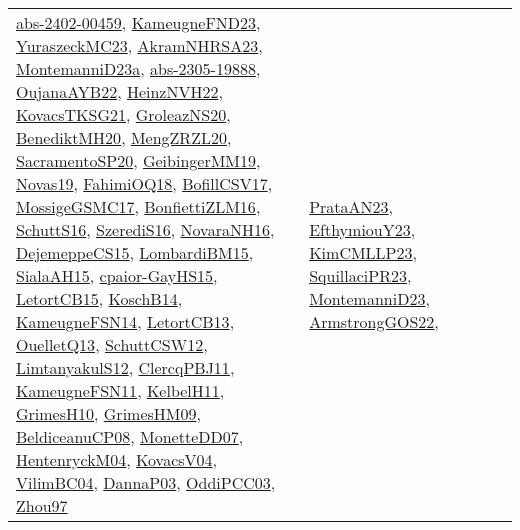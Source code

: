 {\begin{longtable}{llp{6cm}p{6cm}p{6cm}}
\href{articles/abs-2402-00459.pdf}{abs-2402-00459}\cite{abs-2402-00459}, \href{papers/KameugneFND23.pdf}{KameugneFND23}\cite{KameugneFND23}, \href{papers/YuraszeckMC23.pdf}{YuraszeckMC23}\cite{YuraszeckMC23}, \href{articles/AkramNHRSA23.pdf}{AkramNHRSA23}\cite{AkramNHRSA23}, \href{articles/MontemanniD23a.pdf}{MontemanniD23a}\cite{MontemanniD23a}, \href{articles/abs-2305-19888.pdf}{abs-2305-19888}\cite{abs-2305-19888}, \href{papers/OujanaAYB22.pdf}{OujanaAYB22}\cite{OujanaAYB22}, \href{articles/HeinzNVH22.pdf}{HeinzNVH22}\cite{HeinzNVH22}, \href{papers/KovacsTKSG21.pdf}{KovacsTKSG21}\cite{KovacsTKSG21}, \href{papers/GroleazNS20.pdf}{GroleazNS20}\cite{GroleazNS20}, \href{articles/BenediktMH20.pdf}{BenediktMH20}\cite{BenediktMH20}, \href{articles/MengZRZL20.pdf}{MengZRZL20}\cite{MengZRZL20}, \href{articles/SacramentoSP20.pdf}{SacramentoSP20}\cite{SacramentoSP20}, \href{papers/GeibingerMM19.pdf}{GeibingerMM19}\cite{GeibingerMM19}, \href{articles/Novas19.pdf}{Novas19}\cite{Novas19}, \href{articles/FahimiOQ18.pdf}{FahimiOQ18}\cite{FahimiOQ18}, \href{papers/BofillCSV17.pdf}{BofillCSV17}\cite{BofillCSV17}, \href{papers/MossigeGSMC17.pdf}{MossigeGSMC17}\cite{MossigeGSMC17}, \href{papers/BonfiettiZLM16.pdf}{BonfiettiZLM16}\cite{BonfiettiZLM16}, \href{papers/SchuttS16.pdf}{SchuttS16}\cite{SchuttS16}, \href{papers/SzerediS16.pdf}{SzerediS16}\cite{SzerediS16}, \href{articles/NovaraNH16.pdf}{NovaraNH16}\cite{NovaraNH16}, \href{papers/DejemeppeCS15.pdf}{DejemeppeCS15}\cite{DejemeppeCS15}, \href{papers/LombardiBM15.pdf}{LombardiBM15}\cite{LombardiBM15}, \href{papers/SialaAH15.pdf}{SialaAH15}\cite{SialaAH15}, \href{papers/cpaior-GayHS15.pdf}{cpaior-GayHS15}\cite{cpaior-GayHS15}, \href{articles/LetortCB15.pdf}{LetortCB15}\cite{LetortCB15}, \href{papers/KoschB14.pdf}{KoschB14}\cite{KoschB14}, \href{articles/KameugneFSN14.pdf}{KameugneFSN14}\cite{KameugneFSN14}, \href{papers/LetortCB13.pdf}{LetortCB13}\cite{LetortCB13}, \href{papers/OuelletQ13.pdf}{OuelletQ13}\cite{OuelletQ13}, \href{papers/SchuttCSW12.pdf}{SchuttCSW12}\cite{SchuttCSW12}, \href{articles/LimtanyakulS12.pdf}{LimtanyakulS12}\cite{LimtanyakulS12}, \href{papers/ClercqPBJ11.pdf}{ClercqPBJ11}\cite{ClercqPBJ11}, \href{papers/KameugneFSN11.pdf}{KameugneFSN11}\cite{KameugneFSN11}, \href{articles/KelbelH11.pdf}{KelbelH11}\cite{KelbelH11}, \href{papers/GrimesH10.pdf}{GrimesH10}\cite{GrimesH10}, \href{papers/GrimesHM09.pdf}{GrimesHM09}\cite{GrimesHM09}, \href{papers/BeldiceanuCP08.pdf}{BeldiceanuCP08}\cite{BeldiceanuCP08}, \href{papers/MonetteDD07.pdf}{MonetteDD07}\cite{MonetteDD07}, \href{papers/HentenryckM04.pdf}{HentenryckM04}\cite{HentenryckM04}, \href{papers/KovacsV04.pdf}{KovacsV04}\cite{KovacsV04}, \href{papers/VilimBC04.pdf}{VilimBC04}\cite{VilimBC04}, \href{papers/DannaP03.pdf}{DannaP03}\cite{DannaP03}, \href{papers/OddiPCC03.pdf}{OddiPCC03}\cite{OddiPCC03}, \href{articles/Zhou97.pdf}{Zhou97}\cite{Zhou97} & \href{articles/PrataAN23.pdf}{PrataAN23}\cite{PrataAN23}, \href{papers/EfthymiouY23.pdf}{EfthymiouY23}\cite{EfthymiouY23}, \href{papers/KimCMLLP23.pdf}{KimCMLLP23}\cite{KimCMLLP23}, \href{papers/SquillaciPR23.pdf}{SquillaciPR23}\cite{SquillaciPR23}, \href{articles/MontemanniD23.pdf}{MontemanniD23}\cite{MontemanniD23}, \href{papers/ArmstrongGOS22.pdf}{ArmstrongGOS22}\cite{ArmstrongGOS22}, 
\end{longtable}}
